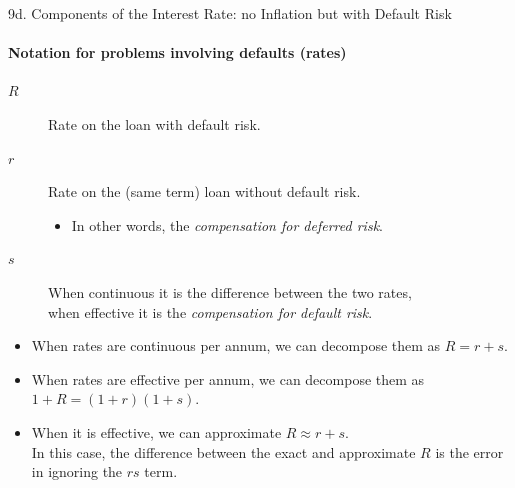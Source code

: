 \begin{CHPT_SUMM_AUTO}[label = {L.-9d}]{9d. Components of the Interest Rate: no Inflation but with Default Risk}
\paragraph{Notation for problems involving defaults (rates)}
\begin{description}
	\item[$R$]	Rate on the loan with default risk.
	\item[$r$]	Rate on the (same term) loan without default risk.
		\begin{itemize}[leftmargin = *]
		\item	In other words, the \textit{compensation for deferred risk}.
		\end{itemize}
	\item[$s$]	When continuous it is the difference between the two rates, 	\\
				when effective it is the \textit{compensation for default risk}.		
\end{description}
\begin{itemize}[leftmargin = *]
	\item	When rates are continuous per annum, we can decompose them as $R = r + s$.
	\item	When rates are effective per annum, we can decompose them as $1 + R = (1 + r)(1 + s)$.
	\item	When it is effective, we can approximate $R \approx r + s$. \\
			In this case, the difference between the exact and approximate $R$ is the error in ignoring the $rs$ term.
\end{itemize}
\end{CHPT_SUMM_AUTO}

